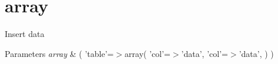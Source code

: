 \hypertarget{array-example}{\section{array}
}
Insert data 
\begin{DoxyParams}{Parameters}
{\em array} & ( 'table'=$>$array( 'col'=$>$'data', 'col'=$>$'data', ) )\\
\hline
\end{DoxyParams}

\begin{DoxyCodeInclude}
\end{DoxyCodeInclude}
 